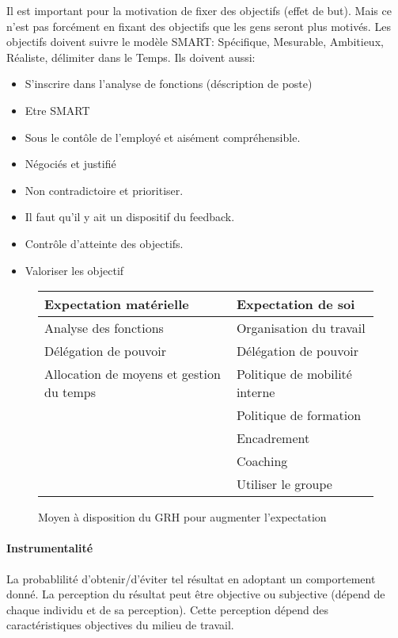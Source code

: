 \documentclass[11pt]{article} %
\begin{document}
		Il est important pour la motivation de fixer des objectifs (effet de but). Mais ce n'est pas forcément en fixant des objectifs que les gens seront plus motivés. Les objectifs doivent suivre le modèle SMART:
		 Spécifique, Mesurable, Ambitieux, Réaliste, délimiter dans le Temps. Ils doivent aussi:
		 \begin{multicols}{2}
		 	\begin{itemize}
				\item S'inscrire dans l'analyse de fonctions (déscription de poste)
				\item Etre SMART
		 		\item Sous le contôle de l'employé et aisément compréhensible.
		 		\item Négociés et justifié
		 		\item Non contradictoire et prioritiser.
		 		\item Il faut qu'il y ait un dispositif du feedback.
		 		\item Contrôle d'atteinte des objectifs.
		 		\item Valoriser les objectif
		 	\end{itemize}
		 \end{multicols}

		\begin{figure}[H]
		\centering
		\begin{tabular}{|l|l|}
			\hline
			\textbf{Expectation matérielle} & \textbf{Expectation de soi} \\
			\hline
			Analyse des fonctions & Organisation du travail\\
			Délégation de pouvoir & Délégation de pouvoir \\
			Allocation de moyens et gestion du temps & Politique de mobilité interne\\
			& Politique de formation\\
			& Encadrement\\
			& Coaching\\
			& Utiliser le groupe\\
			\hline
		\end{tabular}
		\caption{Moyen à disposition du GRH pour augmenter l'expectation}
		\end{figure}
		 
		 \paragraph{Instrumentalité} La probablilité d'obtenir/d'éviter tel résultat en adoptant un
		 comportement donné. La perception du résultat peut être objective ou subjective (dépend de chaque 
		 individu et de sa perception). Cette perception dépend des caractéristiques objectives du milieu de 
		 travail.
		
\end{document}
